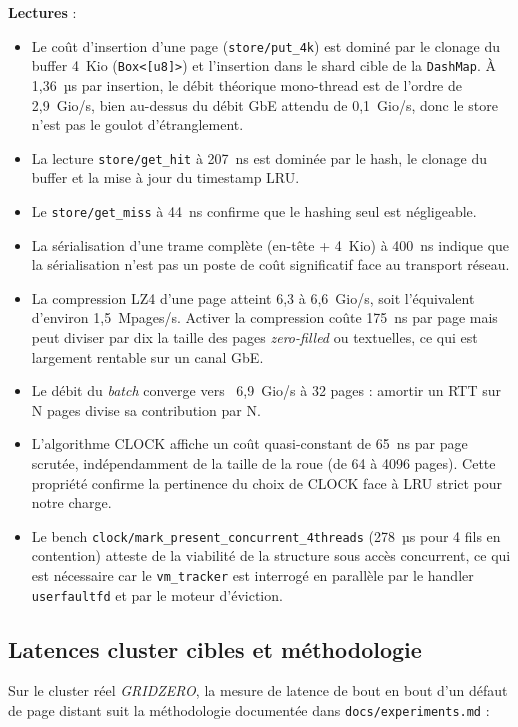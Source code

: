 \textbf{Lectures} :
\begin{itemize}[leftmargin=*]
    \item Le coût d'insertion d'une page (\texttt{store/put\_4k}) est dominé par le clonage du buffer 4~Kio (\texttt{Box<[u8]>}) et l'insertion dans le shard cible de la \texttt{DashMap}. À 1,36~µs par insertion, le débit théorique mono-thread est de l'ordre de 2,9~Gio/s, bien au-dessus du débit GbE attendu de 0,1~Gio/s, donc le store n'est pas le goulot d'étranglement.
    \item La lecture \texttt{store/get\_hit} à 207~ns est dominée par le hash, le clonage du buffer et la mise à jour du timestamp LRU.
    \item Le \texttt{store/get\_miss} à 44~ns confirme que le hashing seul est négligeable.
    \item La sérialisation d'une trame complète (en-tête + 4~Kio) à 400~ns indique que la sérialisation n'est pas un poste de coût significatif face au transport réseau.
    \item La compression LZ4 d'une page atteint 6,3 à 6,6~Gio/s, soit l'équivalent d'environ 1,5~Mpages/s. Activer la compression coûte 175~ns par page mais peut diviser par dix la taille des pages \emph{zero-filled} ou textuelles, ce qui est largement rentable sur un canal GbE.
    \item Le débit du \emph{batch} converge vers ~6,9~Gio/s à 32 pages : amortir un RTT sur N pages divise sa contribution par N.
    \item L'algorithme CLOCK affiche un coût quasi-constant de 65~ns par page scrutée, indépendamment de la taille de la roue (de 64 à 4096 pages). Cette propriété confirme la pertinence du choix de CLOCK face à LRU strict pour notre charge.
    \item Le bench \texttt{clock/mark\_present\_concurrent\_4threads} (278~µs pour 4 fils en contention) atteste de la viabilité de la structure sous accès concurrent, ce qui est nécessaire car le \texttt{vm\_tracker} est interrogé en parallèle par le handler \texttt{userfaultfd} et par le moteur d'éviction.
\end{itemize}

\subsection{Latences cluster cibles et méthodologie}

Sur le cluster réel \emph{GRIDZERO}, la mesure de latence de bout en bout d'un défaut de page distant suit la méthodologie documentée dans \texttt{docs/experiments.md} :

